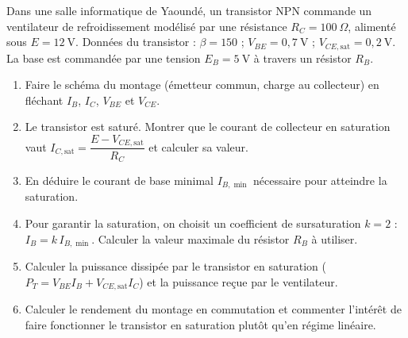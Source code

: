 \documentclass[11pt]{article}
\begin{document}
\begin{exercice}
Dans une salle informatique de Yaoundé, un transistor NPN commande un ventilateur de refroidissement modélisé par une résistance $R_C = 100~\Omega$, alimenté sous $E = 12~\text{V}$. Données du transistor : $\beta = 150$ ; $V_{BE} = 0{,}7~\text{V}$ ; $V_{CE,\text{sat}} = 0{,}2~\text{V}$. La base est commandée par une tension $E_B = 5~\text{V}$ à travers un résistor $R_B$.
\begin{enumerate}
\item Faire le schéma du montage (émetteur commun, charge au collecteur) en fléchant $I_B$, $I_C$, $V_{BE}$ et $V_{CE}$.
\item Le transistor est saturé. Montrer que le courant de collecteur en saturation vaut $I_{C,\text{sat}} = \dfrac{E - V_{CE,\text{sat}}}{R_C}$ et calculer sa valeur.
\item En déduire le courant de base minimal $I_{B,\min}$ nécessaire pour atteindre la saturation.
\item Pour garantir la saturation, on choisit un coefficient de sursaturation $k = 2$ : $I_B = k\, I_{B,\min}$. Calculer la valeur maximale du résistor $R_B$ à utiliser.
\item Calculer la puissance dissipée par le transistor en saturation ($P_T = V_{BE} I_B + V_{CE,\text{sat}} I_C$) et la puissance reçue par le ventilateur.
\item Calculer le rendement du montage en commutation et commenter l'intérêt de faire fonctionner le transistor en saturation plutôt qu'en régime linéaire.
\end{enumerate}
\end{exercice}
\end{document}
